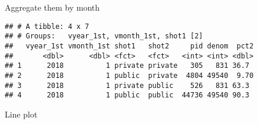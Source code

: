 \documentclass[
]{article}
\newenvironment{Shaded}{\begin{snugshade}}{\end{snugshade}}
\newcommand{\AttributeTok}[1]{\textcolor[rgb]{0.77,0.63,0.00}{#1}}
\newcommand{\CommentTok}[1]{\textcolor[rgb]{0.56,0.35,0.01}{\textit{#1}}}
\newcommand{\DecValTok}[1]{\textcolor[rgb]{0.00,0.00,0.81}{#1}}
\newcommand{\FunctionTok}[1]{\textcolor[rgb]{0.00,0.00,0.00}{#1}}
\newcommand{\NormalTok}[1]{#1}
\newcommand{\OtherTok}[1]{\textcolor[rgb]{0.56,0.35,0.01}{#1}}
\newcommand{\SpecialCharTok}[1]{\textcolor[rgb]{0.00,0.00,0.00}{#1}}
\begin{document}
Aggregate them by month

\begin{Shaded}
\end{Shaded}

\begin{verbatim}
## # A tibble: 4 x 7
## # Groups:   vyear_1st, vmonth_1st, shot1 [2]
##   vyear_1st vmonth_1st shot1   shot2     pid denom  pct2
##       <dbl>      <dbl> <fct>   <fct>   <int> <int> <dbl>
## 1      2018          1 private private   305   831 36.7 
## 2      2018          1 public  private  4804 49540  9.70
## 3      2018          1 private public    526   831 63.3 
## 4      2018          1 public  public  44736 49540 90.3
\end{verbatim}

Line plot
\end{document}
